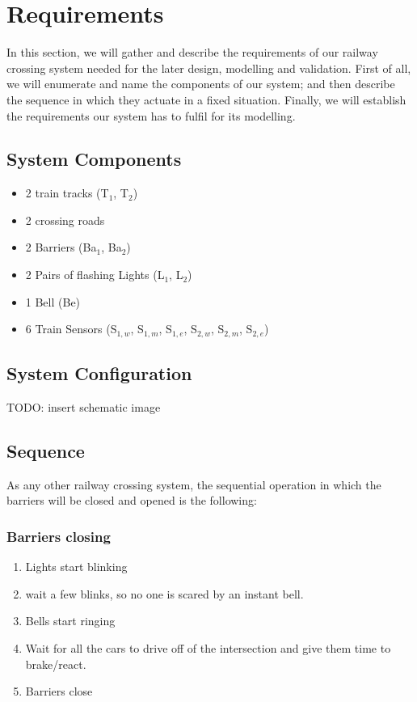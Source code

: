 \documentclass[final]{report}
\begin{document}
\chapter{Requirements}
In this section, we will gather and describe the requirements of our railway crossing system needed for the later design, modelling and validation.
First of all, we will enumerate and name the components of our system; and then describe the sequence in which they actuate in a fixed situation.
Finally, we will establish the requirements our system has to fulfil for its modelling.


\section{System Components} 
\begin{itemize}
\item 2 train tracks (T$_{1}$, T$_{2}$)
\item 2 crossing roads 
\item 2 Barriers (Ba$_{1}$, Ba$_{2}$)
\item 2 Pairs of flashing Lights (L$_{1}$, L$_{2}$) 
\item 1 Bell (Be)
\item 6 Train Sensors (S$_{1,w}$, S$_{1,m}$, S$_{1,e}$, S$_{2,w}$, S$_{2,m}$, S$_{2,e}$)
\end{itemize}
\section{System Configuration}
TODO: insert schematic image

\section{Sequence}
As any other railway crossing system, the sequential operation in which the barriers will be closed and opened is the following:

\subsection{Barriers closing}
\begin{enumerate}
\item Lights start blinking
\item wait a few blinks, so no one is scared by an instant bell.
\item Bells start ringing
\item Wait for all the cars to drive off of the intersection and give them time to brake/react.
\item Barriers close
\end{enumerate}
\end{document}
